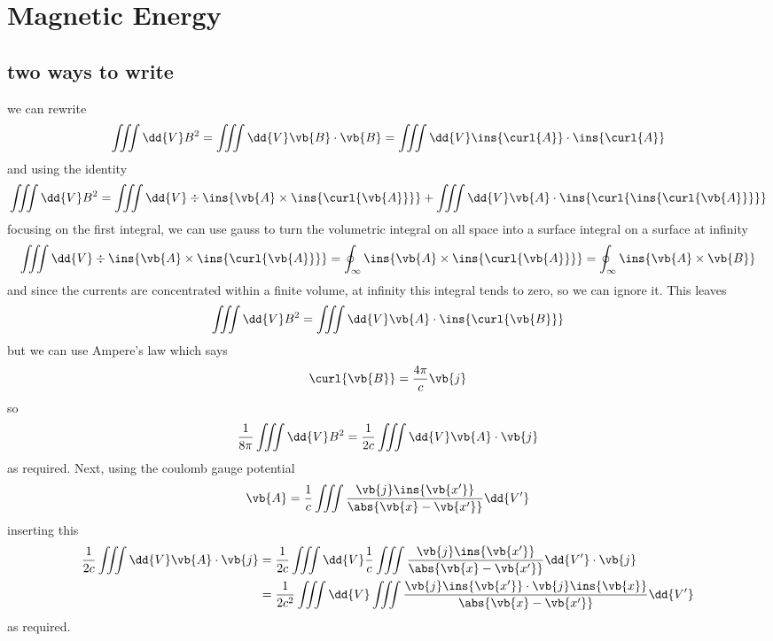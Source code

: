 \clearpage
\section{Magnetic Energy}
\subsection{two ways to write}
we can rewrite 
\begin{equation}
	\iiint\dd{V}B^2=\iiint\dd{V}\vb{B}\cdot\vb{B}=\iiint\dd{V}\ins{\curl{A}}\cdot\ins{\curl{A}}
\end{equation}
and using the identity 
\begin{equation}
	\iiint\dd{V}B^2=\iiint\dd{V}\div{\ins{\vb{A}\times\ins{\curl{\vb{A}}}}}+\iiint\dd{V}\vb{A}\cdot\ins{\curl{\ins{\curl{\vb{A}}}}}
\end{equation}
focusing on the first integral, we can use gauss to turn the volumetric integral on all space into a surface integral on a surface at infinity
\begin{equation}
	\iiint\dd{V}\div{\ins{\vb{A}\times\ins{\curl{\vb{A}}}}} = \oint_\infty\ins{\vb{A}\times\ins{\curl{\vb{A}}}}= \oint_\infty\ins{\vb{A}\times \vb{B}}
\end{equation}
and since the currents are concentrated within a finite volume, at infinity this integral tends to zero, so we can ignore it. This leaves 
\begin{equation}
	\iiint\dd{V}B^2=\iiint\dd{V}\vb{A}\cdot\ins{\curl{\vb{B}}}
\end{equation}
but we can use Ampere's law which says 
\begin{equation}
	\curl{\vb{B}} = \frac{4\pi}{c}\vb{j}
\end{equation}
so 
\begin{equation}
	\frac{1}{8\pi}\iiint\dd{V}B^2=\frac{1}{2c}\iiint\dd{V}\vb{A}\cdot\vb{j}
\end{equation}
as required. Next, using the coulomb gauge potential 
\begin{equation}
	\vb{A}=\frac{1}{c}\iiint\frac{\vb{j}\ins{\vb{x'}}}{\abs{\vb{x}-\vb{x'}}}\dd{V'}
\end{equation}
inserting this 
\begin{align}
	\frac{1}{2c}\iiint\dd{V}\vb{A}\cdot\vb{j} &= \frac{1}{2c}\iiint\dd{V}\frac{1}{c}\iiint\frac{\vb{j}\ins{\vb{x'}}}{\abs{\vb{x}-\vb{x'}}}\dd{V'}\cdot\vb{j}\\
	&=\frac{1}{2c^2}\iiint\dd{V}\iiint\frac{\vb{j}\ins{\vb{x'}}\cdot\vb{j}\ins{\vb{x}}}{\abs{\vb{x}-\vb{x'}}}\dd{V'}
\end{align}
as required.
